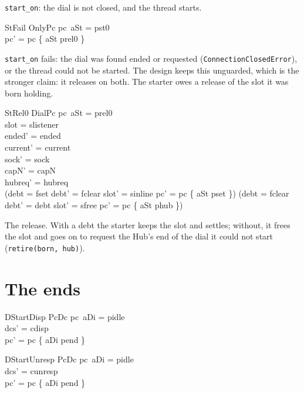 \documentclass[a4paper,10pt,fleqn]{article}
\begin{document}
\texttt{start\_on}: the dial is not closed, and the thread starts.

\begin{schema}{StFail}
  OnlyPc
\where
  pc~aSt = pst0 \\
  pc' = pc \oplus \{ aSt \mapsto prel0 \}
\end{schema}

\texttt{start\_on} fails: the dial was found ended or requested
(\texttt{ConnectionClosedError}), or the thread could not be started.  The
design keeps this unguarded, which is the stronger claim: it releases on both.
The starter owes a release of the slot it was born holding.

\begin{schema}{StRel0}
  DialPc
\where
  pc~aSt = prel0 \\
  slot = slistener \\
  ended' = ended \\
  current' = current \\
  sock' = sock \\
  capN' = capN \\
  hubreq' = hubreq \\
  (debt = fset \land debt' = fclear \land slot' = sinline \land
    pc' = pc \oplus \{ aSt \mapsto pset \}) \lor
  (debt = fclear \land debt' = debt \land slot' = sfree \land
    pc' = pc \oplus \{ aSt \mapsto phub \})
\end{schema}

The release.  With a debt the starter keeps the slot and settles; without, it
frees the slot and goes on to request the Hub's end of the dial it could not
start (\texttt{retire(born, hub)}).

\section{The ends}

\begin{schema}{DStartDisp}
  PcDc
\where
  pc~aDi = pidle \\
  dcs' = cdisp \\
  pc' = pc \oplus \{ aDi \mapsto pend \}
\end{schema}

\begin{schema}{DStartUnresp}
  PcDc
\where
  pc~aDi = pidle \\
  dcs' = cunresp \\
  pc' = pc \oplus \{ aDi \mapsto pend \}
\end{schema}
\end{document}
